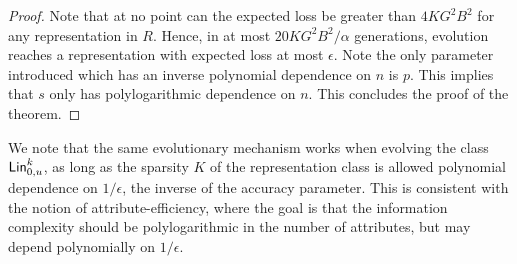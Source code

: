 \begin{proof}
Note that at no point can the expected loss be greater than $4KG^2B^2$ for any
representation in $R$. Hence, in at most $20 KG^2B^2/\alpha$ generations,
evolution reaches a representation with expected loss at most $\epsilon$. Note
the only parameter introduced which has an inverse polynomial dependence on $n$
is $p$. This implies that $s$ only has polylogarithmic dependence on $n$. This
concludes the proof of the theorem.
\end{proof}

\begin{remark} We note that the same evolutionary mechanism works when evolving
the class $\mathsf{Lin}^k_{0, u}$, as long as the sparsity $K$ of the representation
class is allowed polynomial dependence on $1/\epsilon$, the inverse of the accuracy parameter.
This is consistent with the notion of attribute-efficiency, where the goal is
that the information complexity should be polylogarithmic in the number of
attributes, but may depend polynomially on $1/\epsilon$.
\end{remark}
